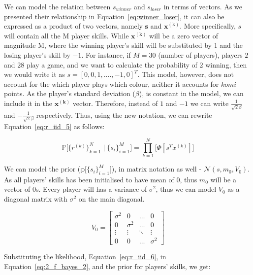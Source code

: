\documentclass[a4paper,11pt]{article}
\theoremstyle{mytheor}
\begin{document}
We can model the relation between $s_{winner}$ and $s_{loser}$ in terms of vectors. As we presented their relationship in Equation~\ref{eq:winner_loser}, it can also be expressed as a product of two vectors, namely $\bm{s}$ and $\bm{x^{(k)}}$. More specifically, $s$ will contain all the M player skills. While $\bm{x^{(k)}}$ will be a zero vector of magnitude M, where the winning player's skill will be substituted by $1$ and the losing player's skill by $-1$. For instance, if $M=30$ (number of players), players $2$ and $28$ play a game, and we want to calculate the probability of $2$ winning, then we would write it as $s=[0,0,1,....,-1,0]^T$. This model, however, does not account for the which player plays which colour, neither it accounts for $komi$ points. As the player's standard deviation ($\beta$), is constant in the model, we can include it in the $\bm{x^{(k)}}$ vector. Therefore, instead of $1$ and $-1$ we can write $\frac{1}{\sqrt{2}\beta}$ and $-\frac{1}{\sqrt{2}\beta}$ respectively. Thus, using the new notation, we can rewrite Equation~\ref{eq:r_iid_5} as follows:

\begin{equation}
    \label{eq:r_iid_6}
    \mathbb{P} \Big[ \{r^{(k)}\}_{k=1}^{N}  \mid \{s_i\}_{i=1}^{M} \Big] = 
    \prod_{k=1}^{N}\Big[
        \Phi[s^Tx^{(k)}]
    \Big]
\end{equation}

We can model the prior ($\mathbb{p} \Big[ \{s_i\}_{i=1}^{M} \Big]$), in matrix notation as well - $\mathcal{N}(s, m_0, V_0)$. As all players' skills has been initialised to have mean of 0, thus $m_0$ will be a vector of $0$s. Every player will has a variance of $\sigma^2$, thus we can model $V_0$ as a diagonal matrix with $\sigma^2$ on the main diagonal.

\begin{equation}
    \label{eq:V_0}
    V_0 = \begin{bmatrix}
            \sigma^2 &  0  & \ldots & 0\\
            0  &  \sigma^2 & \ldots & 0\\
            \vdots & \vdots & \ddots & \vdots\\
            0  &   0       &\ldots & \sigma^2
           \end{bmatrix}
\end{equation}

Substituting the likelihood, Equation~\ref{eq:r_iid_6}, in Equation~\ref{eq:2_f_bayes_2}, and the prior for players' skills, we get:
\end{document}
